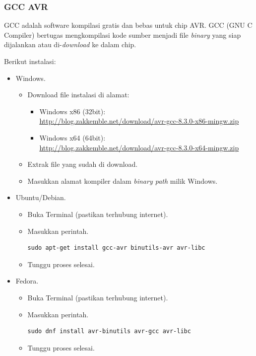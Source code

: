 \documentclass[12pt,]{article}
\begin{document}
	\subsubsection{GCC AVR}
	GCC adalah software kompilasi gratis dan bebas untuk chip AVR.
	GCC (GNU C Compiler) bertugas mengkompilasi kode sumber menjadi file \textit{binary} yang siap dijalankan atau di-\textit{download} ke dalam chip.

	Berikut instalasi:
	\begin{itemize}
		\item Windows.
		\begin{itemize}
			\item Download file instalasi di alamat:
			\begin{itemize}
				\item Windows x86 (32bit):\\
				\url{http://blog.zakkemble.net/download/avr-gcc-8.3.0-x86-mingw.zip}
				\item Windows x64 (64bit):\\
				\url{http://blog.zakkemble.net/download/avr-gcc-8.3.0-x64-mingw.zip}
			\end{itemize}
			\item Extrak file yang sudah di download.
			\item Masukkan alamat kompiler dalam \textit{binary path} milik Windows.
		\end{itemize}
	
		\item Ubuntu/Debian.
		\begin{itemize}
			\item Buka Terminal (pastikan terhubung internet).
			\item Masukkan perintah.
			\begin{verbatim}
sudo apt-get install gcc-avr binutils-avr avr-libc
			\end{verbatim}
			\item Tunggu proses selesai.
		\end{itemize}
		
		\item Fedora.
		\begin{itemize}
			\item Buka Terminal (pastikan terhubung internet).
			\item Masukkan perintah.
			\begin{verbatim}
sudo dnf install avr-binutils avr-gcc avr-libc
			\end{verbatim}
			\item Tunggu proses selesai.
		\end{itemize}
		

\end{itemize}
\end{document}

